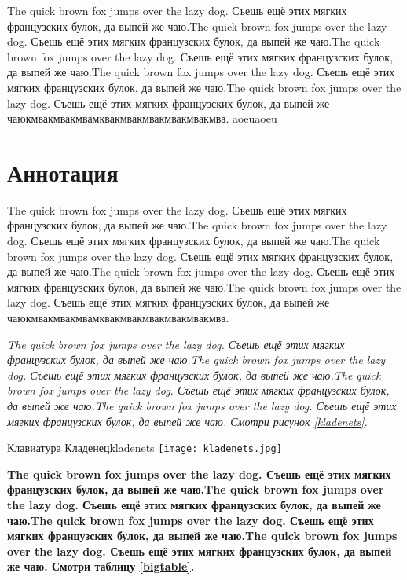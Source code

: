 \documentclass{diploma}
\begin{document}
\tableofcontents\fixTexttTextscSpaceBug


The quick brown fox jumps over the lazy dog. Съешь ещё этих мягких французских булок, да выпей же чаю.The quick brown fox jumps over the lazy dog. Съешь ещё этих мягких французских булок, да выпей же чаю.The quick brown fox jumps over the lazy dog. Съешь ещё этих мягких французских булок, да выпей же чаю.The quick brown fox jumps over the lazy dog. Съешь ещё этих мягких французских булок, да выпей же чаю.The quick brown fox jumps over the lazy dog. Съешь ещё этих мягких французских булок, да выпей же чаюкмвакмвакмвамквакмвакмвакмвакмвакмва.
aoeuaoeu

\chapter{Аннотация}

\textrm{The quick brown fox jumps over the lazy dog. Съешь ещё этих мягких французских булок, да выпей же чаю.The quick brown fox jumps over the lazy dog. Съешь ещё этих мягких французских булок, да выпей же чаю.The quick brown fox jumps over the lazy dog. Съешь ещё этих мягких французских булок, да выпей же чаю.The quick brown fox jumps over the lazy dog. Съешь ещё этих мягких французских булок, да выпей же чаю.The quick brown fox jumps over the lazy dog. Съешь ещё этих мягких французских булок, да выпей же чаюкмвакмвакмвамквакмвакмвакмвакмвакмва.}

\textit{The quick brown fox jumps over the lazy dog. Съешь ещё этих мягких французских булок, да выпей же чаю.The quick brown fox jumps over the lazy dog. Съешь ещё этих мягких французских булок, да выпей же чаю.The quick brown fox jumps over the lazy dog. Съешь ещё этих мягких французских булок, да выпей же чаю.The quick brown fox jumps over the lazy dog. Съешь ещё этих мягких французских булок, да выпей же чаю. Смотри рисунок \ref{kladenets}.} 

\begin{gostimage}{Клавиатура Кладенец}{kladenets}
	\texttt{[image: kladenets.jpg]}
\end{gostimage}

\textbf{The quick brown fox jumps over the lazy dog. Съешь ещё этих мягких французских булок, да выпей же чаю.The quick brown fox jumps over the lazy dog. Съешь ещё этих мягких французских булок, да выпей же чаю.The quick brown fox jumps over the lazy dog. Съешь ещё этих мягких французских булок, да выпей же чаю.The quick brown fox jumps over the lazy dog. Съешь ещё этих мягких французских булок, да выпей же чаю. Смотри таблицу \ref{bigtable}.}
\end{document}
